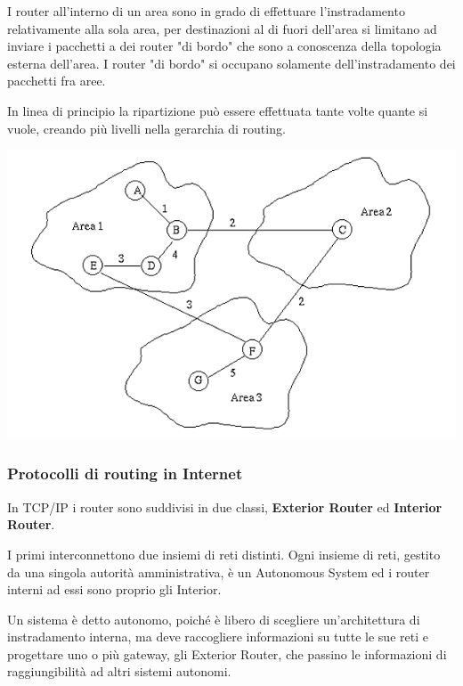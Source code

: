            I router all'interno di un area sono in grado di effettuare l'instradamento relativamente alla sola area, per destinazioni al di fuori dell'area si limitano ad inviare i pacchetti a dei router "di bordo" che sono a conoscenza della topologia esterna dell'area. I router "di bordo" si occupano solamente dell'instradamento dei pacchetti fra aree.

            In linea di principio la ripartizione può essere effettuata tante volte quante si vuole, creando più livelli nella gerarchia di routing.

            \begin{center}
                \includegraphics[scale=0.45]{chapters/4/assets/schema_w.png}
            \end{center}

        \subsubsection{Protocolli di routing in Internet}
            In TCP/IP i router sono suddivisi in due classi, \textbf{Exterior Router} ed \textbf{Interior Router}.
        
            I primi interconnettono due insiemi di reti distinti. Ogni insieme di reti, gestito da una singola autorità amministrativa, è un Autonomous System ed i router interni ad essi sono proprio gli Interior.
        
            Un sistema è detto autonomo, poiché è libero di scegliere un'architettura di instradamento interna, ma deve raccogliere informazioni su tutte le sue reti e progettare uno o più gateway, gli Exterior Router, che passino le informazioni di raggiungibilità ad altri sistemi autonomi.
        
